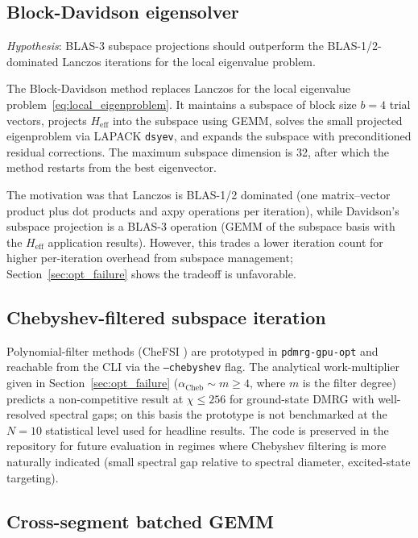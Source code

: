 \documentclass[preprint,12pt]{elsarticle}
\begin{document}
\subsection{Block-Davidson eigensolver}
\label{sec:davidson}

\emph{Hypothesis}: BLAS-3 subspace projections should outperform the BLAS-1/2-dominated Lanczos iterations for the local eigenvalue problem.

The Block-Davidson method \cite{Davidson1975} replaces Lanczos for the local eigenvalue problem~\eqref{eq:local_eigenproblem}.
It maintains a subspace of block size $b = 4$ trial vectors, projects $H_\text{eff}$ into the subspace using GEMM, solves the small projected eigenproblem via LAPACK \texttt{dsyev}, and expands the subspace with preconditioned residual corrections.
The maximum subspace dimension is 32, after which the method restarts from the best eigenvector.

The motivation was that Lanczos is BLAS-1/2 dominated (one matrix--vector product plus dot products and axpy operations per iteration), while Davidson's subspace projection is a BLAS-3 operation (GEMM of the subspace basis with the $H_\text{eff}$ application results).
However, this trades a lower iteration count for higher per-iteration overhead from subspace management; Section~\ref{sec:opt_failure} shows the tradeoff is unfavorable.

\subsection{Chebyshev-filtered subspace iteration}
\label{sec:chebyshev}

Polynomial-filter methods (CheFSI \cite{Zhou2006}) are prototyped in \texttt{pdmrg-gpu-opt} and reachable from the CLI via the \texttt{--chebyshev} flag. The analytical work-multiplier given in Section~\ref{sec:opt_failure} ($\alpha_\text{Cheb} \sim m \geq 4$, where $m$ is the filter degree) predicts a non-competitive result at $\chi \le 256$ for ground-state DMRG with well-resolved spectral gaps; on this basis the prototype is not benchmarked at the $N{=}10$ statistical level used for headline results. The code is preserved in the repository for future evaluation in regimes where Chebyshev filtering is more naturally indicated (small spectral gap relative to spectral diameter, excited-state targeting).

\subsection{Cross-segment batched GEMM}
\label{sec:batched_sweep}
\end{document}

